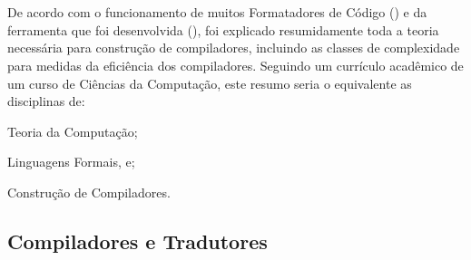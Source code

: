 

\chapter{}
\label{chapter:fundamentacaoTeorica}

De acordo com o funcionamento de muitos Formatadores de Código () e
da ferramenta que foi desenvolvida (),
foi explicado resumidamente toda a teoria necessária para construção de compiladores,
incluindo as classes de complexidade para medidas da eficiência dos compiladores.
Seguindo um currículo acadêmico de um curso de Ciências da Computação,
este resumo seria o equivalente as disciplinas de:
\begin{inparaenum}[1)]
\item Teoria da Computação;
\item Linguagens Formais, e;
\item Construção de Compiladores.
\end{inparaenum}%


\section{Compiladores e Tradutores}
\label{section:compiladoresEtradutores}

